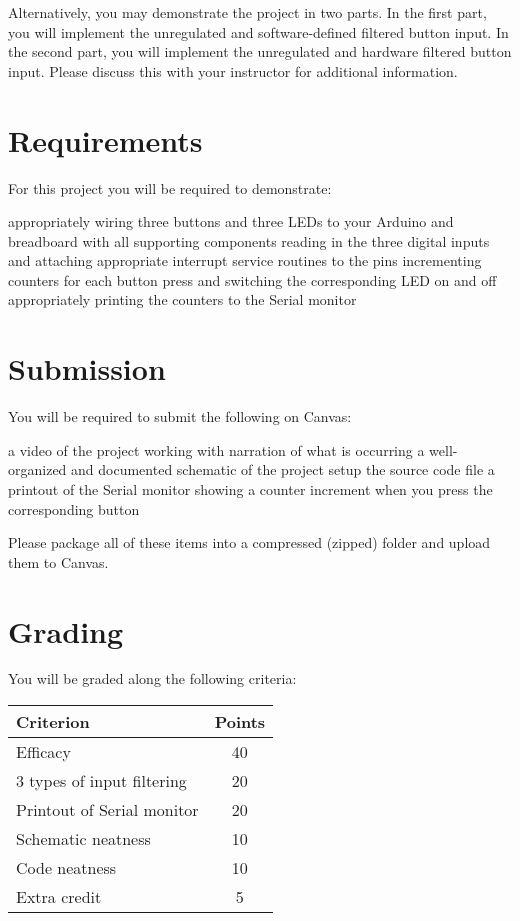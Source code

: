 Alternatively, you may demonstrate the project in two parts. In the first part, you will implement the unregulated and software-defined filtered button input.
In the second part, you will implement the unregulated and hardware filtered button input.
Please discuss this with your instructor for additional information.

\section*{Requirements}
For this project you will be required to demonstrate:

\begin{outline}
    \1 appropriately wiring three buttons and three LEDs to your Arduino and breadboard with all supporting components
    \1 reading in the three digital inputs and attaching appropriate interrupt service routines to the pins
    \1 incrementing counters for each button press and switching the corresponding LED on and off
    \1 appropriately printing the counters to the Serial monitor
\end{outline}

\section*{Submission}
You will be required to submit the following on Canvas:
\begin{outline}
    \1 a video of the project working with narration of what is occurring
    \1 a well-organized and documented schematic of the project setup
    \1 the source code file
    \1 a printout of the Serial monitor showing a counter increment when you press the corresponding button
\end{outline}
Please package all of these items into a compressed (zipped) folder and upload them to Canvas.

\section*{Grading}
You will be graded along the following criteria:

\begin{table*}[ht!]
    \begin{tabular}{ l | c }
        \toprule
        Criterion & Points \\

        \midrule
        Efficacy & 40 \\
        3 types of input filtering & 20 \\
        Printout of Serial monitor & 20 \\
        Schematic neatness & 10 \\
        Code neatness & 10 \\
        Extra credit & 5 \\

        \bottomrule
    \end{tabular}
\end{table*}

